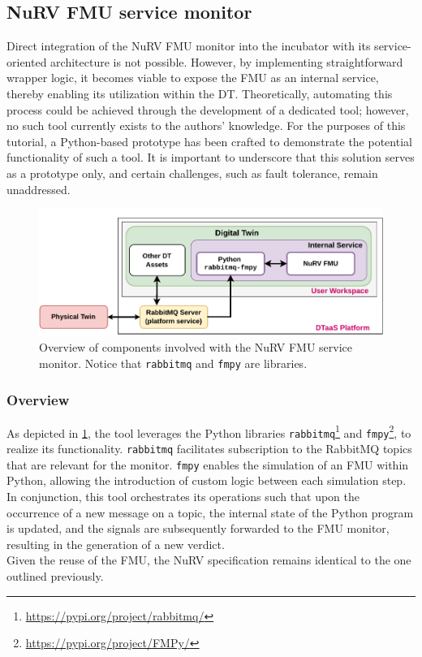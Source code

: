 \subsection{NuRV FMU service monitor}\label{subsec:NuRVsermoni}
Direct integration of the NuRV FMU monitor into the incubator with its service-oriented architecture is not possible.
However, by implementing straightforward wrapper logic, it becomes viable to expose the FMU as an internal service, thereby enabling its utilization within the DT.
Theoretically, automating this process could be achieved through the development of a dedicated tool; however, no such tool currently exists to the authors' knowledge.
For the purposes of this tutorial, a Python-based prototype has been crafted to demonstrate the potential functionality of such a tool.
It is important to underscore that this solution serves as a prototype only, and certain challenges, such as fault tolerance, remain unaddressed.%
%
\begin{figure}[ht]
	\centering
	\includegraphics[width=\linewidth]{images/NuRV-FMU-integration.pdf}
	\caption{Overview of components involved with the NuRV FMU service monitor. Notice that \lstinline{rabbitmq} and \lstinline{fmpy} are libraries.}
	\label{fig:nurv-fmu-service}
\end{figure}%
%
\subsubsection{Overview}
As depicted in \cref{fig:nurv-fmu-service}, the tool leverages the Python libraries \lstinline{rabbitmq}\footnote{\url{https://pypi.org/project/rabbitmq/}} and \lstinline{fmpy}\footnote{\url{https://pypi.org/project/FMPy/}}, to realize its functionality.
\lstinline{rabbitmq} facilitates subscription to the RabbitMQ topics that are relevant for the monitor.
\lstinline{fmpy} enables the simulation of an FMU within Python, allowing the introduction of custom logic between each simulation step.
In conjunction, this tool orchestrates its operations such that upon the occurrence of a new message on a topic, the internal state of the Python program is updated, and the signals are subsequently forwarded to the FMU monitor, resulting in the generation of a new verdict.\\
Given the reuse of the FMU, the NuRV specification remains identical to the one outlined previously.

